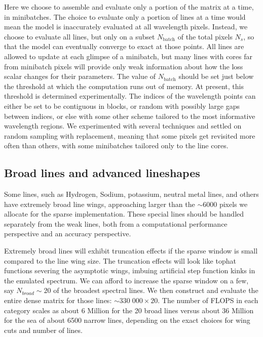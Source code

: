 \documentclass[modern]{aastex631}
\begin{document}
Here we choose to assemble and evaluate only a portion of the matrix at a time, in minibatches. The choice to evaluate only a portion of lines at a time would mean the model is inaccurately evaluated at all wavelength pixels. Instead, we choose to evaluate all lines, but only on a subset $N_{\mathrm{batch}}$ of the total pixels $N_s$, so that the model can eventually converge to exact at those points. All lines are allowed to update at each glimpse of a minibatch, but many lines with cores far from minibatch pixels will provide only weak information about how the loss scalar changes for their parameters. The value of $N_{\mathrm{batch}}$ should be set just below the threshold at which the computation runs out of memory. At present, this threshold is determined experimentally. The indices of the wavelength points can either be set to be contiguous in blocks, or random with possibly large gaps between indices, or else with some other scheme tailored to the most informative wavelength regions. We experimented with several techniques and settled on random sampling with replacement, meaning that some pixels get revisited more often than others, with some minibatches tailored only to the line cores.

\subsection{Broad lines and advanced lineshapes}

Some lines, such as Hydrogen, Sodium, potassium, neutral metal lines, and others have extremely broad line wings, approaching larger than the $\sim6000$ pixels we allocate for the sparse implementation. These special lines should be handled separately from the weak lines, both from a computational performance perspective and an accuracy perspective.

Extremely broad lines will exhibit truncation effects if the sparse window is small compared to the line wing size. The truncation effects will look like tophat functions severing the asymptotic wings, imbuing artificial step function kinks in the emulated spectrum. We can afford to increase the sparse window on a few, say $N_{broad}\sim20$ of the broadest spectral lines. We then construct and evaluate the entire dense matrix for those lines: $\sim 330\;000 \times 20$. The number of FLOPS in each category scales as about 6 Million for the 20 broad lines versus about 36 Million for the sea of about 6500 narrow lines, depending on the exact choices for wing cuts and number of lines.
\end{document}

